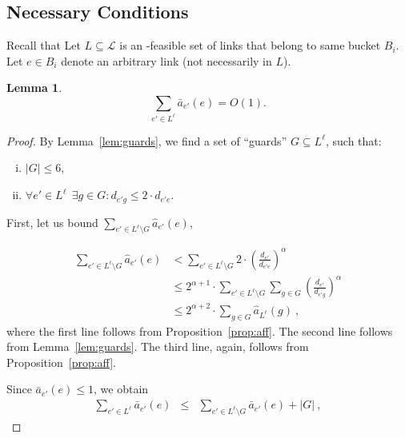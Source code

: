 \documentclass[11pt]{article}
\newenvironment{proof sketch}{\noindent {\bf Proof sketch:} }{\hfill \qed}
\newtheorem{lemma}{Lemma}
\newcommand{\sinr}{\text{\sc{sinr}}}
\newcommand{\LL}{\mathcal{L}}
\begin{document}
\subsection{Necessary Conditions}
Recall that Let $L \subseteq \LL$ is an \sinr-feasible set of links that
belong to same bucket $B_i$.
Let $e\in B_i$ denote an arbitrary link (not
necessarily in $L$).
\begin{lemma}\label{lemma:in degree}
  $$\sum_{e' \in L ^{\ell}} {\bar a}_{e'}(e) = O(1).$$
\end{lemma}
\begin{proof}
  By Lemma~\ref{lem:guards}, we find a set of ``guards'' $G \subseteq
  L^{\ell}$, such that:
\begin{enumerate}[(i)]
        \item \label{item: g6} $|G| \leq 6$,
        \item \label{item:gsidt}$\forall e' \in L^{\ell}~~ \exists g \in G : d_{e'g} \leq 2\cdot d_{e'e}.$
    \end{enumerate}
First, let us bound $\sum_{e' \in L ^{\ell} \setminus G} {\hat a}_{e'}(e)$,

\begin{align}
   \sum_{e' \in L ^{\ell} \setminus G} {\hat a}_{e'}(e) & <    \sum_{e' \in L ^{\ell} \setminus G} 2 \cdot \left(\frac{d_{e'}}{d_{e'e}}\right)^{\alpha} \nonumber \\
  &\leq 2^{\alpha+1} \cdot \sum_{e' \in L ^{\ell}\setminus G} \sum_{g \in G}\left(\frac{d_{e'}}{d_{e'g}}\right)^{\alpha} \nonumber \\
  &\leq 2^{\alpha+2} \cdot \sum_{g \in G} \hat{a}_{L^{\ell}} (g) \label{eq:ll1}\:,
\end{align}
where the first line follows from Proposition~\ref{prop:aff}. The second line follows from
Lemma~\ref{lem:guards}. The third line, again, follows from Proposition~\ref{prop:aff}.


Since ${\bar a}_{e'}(e) \leq 1$, we obtain
\begin{eqnarray}
    \sum_{e' \in L ^{\ell}} {\bar a}_{e'}(e) &  \leq    &   \sum_{e' \in L^{\ell} \setminus G}  {\bar a}_{e'}(e) + |G| \label{eq:ll2}\:,
\end{eqnarray}




\end{proof}
\end{document}
